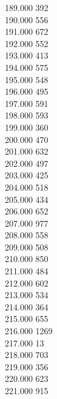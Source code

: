 { 189.000	392 \\
 190.000	556 \\
 191.000	672 \\
 192.000	552 \\
 193.000	413 \\
 194.000	575 \\
 195.000	548 \\
 196.000	495 \\
 197.000	591 \\
 198.000	593 \\
 199.000	360 \\
 200.000	470 \\
 201.000	632 \\
 202.000	497 \\
 203.000	425 \\
 204.000	518 \\
 205.000	434 \\
 206.000	652 \\
 207.000	977 \\
 208.000	558 \\
 209.000	508 \\
 210.000	850 \\
 211.000	484 \\
 212.000	602 \\
 213.000	534 \\
 214.000	364 \\
 215.000	655 \\
 216.000	1269 \\
 217.000	13 \\
 218.000	703 \\
 219.000	356 \\
 220.000	623 \\
 221.000	915 \\
}
